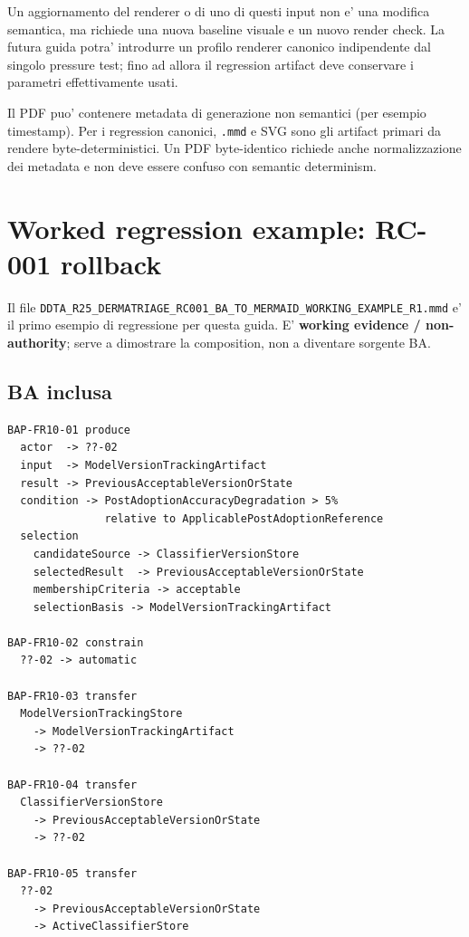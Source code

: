 \documentclass[11pt,a4paper]{article}
\begin{document}
Un aggiornamento del renderer o di uno di questi input non e' una modifica semantica, ma richiede una nuova baseline visuale e un nuovo render check. La futura guida potra' introdurre un profilo renderer canonico indipendente dal singolo pressure test; fino ad allora il regression artifact deve conservare i parametri effettivamente usati.

\begin{ddtaopen}[title={PDF byte determinism}]
Il PDF puo' contenere metadata di generazione non semantici (per esempio timestamp). Per i regression canonici, \texttt{.mmd} e SVG sono gli artifact primari da rendere byte-deterministici. Un PDF byte-identico richiede anche normalizzazione dei metadata e non deve essere confuso con semantic determinism.
\end{ddtaopen}

\section{Worked regression example: RC-001 rollback}

Il file \nolinkurl{DDTA_R25_DERMATRIAGE_RC001_BA_TO_MERMAID_WORKING_EXAMPLE_R1.mmd} e' il primo esempio di regressione per questa guida. E' \textbf{working evidence / non-authority}; serve a dimostrare la composition, non a diventare sorgente BA.

\subsection{BA inclusa}

\begin{lstlisting}
BAP-FR10-01 produce
  actor  -> ??-02
  input  -> ModelVersionTrackingArtifact
  result -> PreviousAcceptableVersionOrState
  condition -> PostAdoptionAccuracyDegradation > 5%
               relative to ApplicablePostAdoptionReference
  selection
    candidateSource -> ClassifierVersionStore
    selectedResult  -> PreviousAcceptableVersionOrState
    membershipCriteria -> acceptable
    selectionBasis -> ModelVersionTrackingArtifact

BAP-FR10-02 constrain
  ??-02 -> automatic

BAP-FR10-03 transfer
  ModelVersionTrackingStore
    -> ModelVersionTrackingArtifact
    -> ??-02

BAP-FR10-04 transfer
  ClassifierVersionStore
    -> PreviousAcceptableVersionOrState
    -> ??-02

BAP-FR10-05 transfer
  ??-02
    -> PreviousAcceptableVersionOrState
    -> ActiveClassifierStore
\end{lstlisting}
\end{document}
